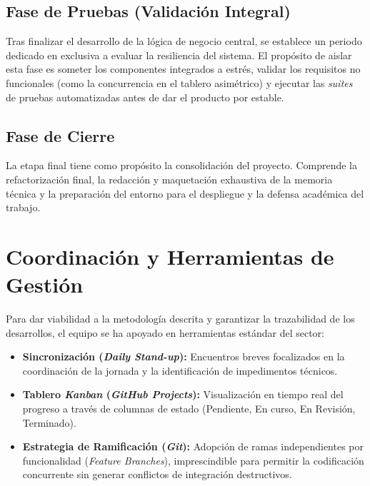 \subsection{Fase de Pruebas (Validación Integral)}
Tras finalizar el desarrollo de la lógica de negocio central, se establece un periodo dedicado en exclusiva a evaluar la resiliencia del sistema. El propósito de aislar esta fase es someter los componentes integrados a estrés, validar los requisitos no funcionales (como la concurrencia en el tablero asimétrico) y ejecutar las \textit{suites} de pruebas automatizadas antes de dar el producto por estable.

\subsection{Fase de Cierre}
La etapa final tiene como propósito la consolidación del proyecto. Comprende la refactorización final, la redacción y maquetación exhaustiva de la memoria técnica y la preparación del entorno para el despliegue y la defensa académica del trabajo.

\section{Coordinación y Herramientas de Gestión}
Para dar viabilidad a la metodología descrita y garantizar la trazabilidad de los desarrollos, el equipo se ha apoyado en herramientas estándar del sector:

\begin{itemize}
    \item \textbf{Sincronización (\textit{Daily Stand-up}):} Encuentros breves focalizados en la coordinación de la jornada y la identificación de impedimentos técnicos.
    \item \textbf{Tablero \textit{Kanban} (\textit{GitHub Projects}):} Visualización en tiempo real del progreso a través de columnas de estado (Pendiente, En curso, En Revisión, Terminado).
    \item \textbf{Estrategia de Ramificación (\textit{Git}):} Adopción de ramas independientes por funcionalidad (\textit{Feature Branches}), imprescindible para permitir la codificación concurrente sin generar conflictos de integración destructivos.
\end{itemize}
